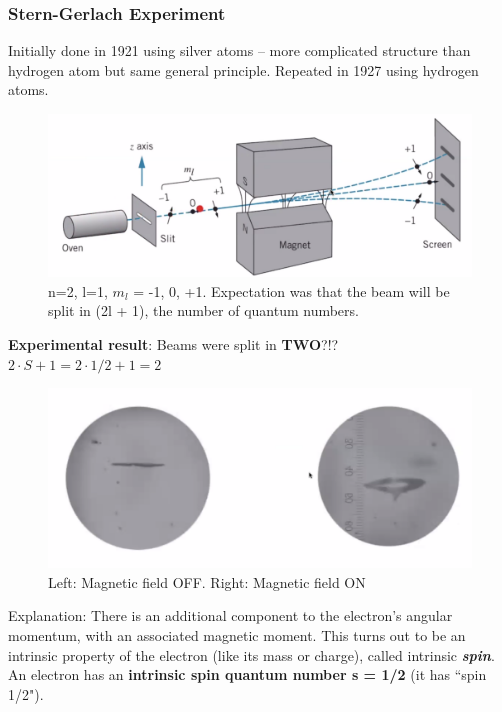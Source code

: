 \documentclass[class=article,crop=false]{standalone}
\begin{document}
\subsubsection{Stern-Gerlach Experiment}
Initially done in 1921 using silver atoms -- more complicated structure than hydrogen atom but same general principle. Repeated in 1927 using hydrogen atoms.

\begin{figure}[h!]
	\centering
	\includegraphics[width=1\linewidth]{./Images/gerlach.png}
	\caption{n=2, l=1, $m_l$ = -1, 0, +1. Expectation was that the beam will be split in (2l + 1), the number of quantum numbers.}
\end{figure}

\textbf{Experimental result}: Beams were split in \textbf{TWO}?!? \\
$ 2 \cdot S + 1 = 2 \cdot 1/2 + 1 = 2 $ \\

\begin{figure}[h!]
	\centering
	\includegraphics[width=.8\linewidth]{./Images/gerlach_results.png}
	\caption{Left: Magnetic field OFF. Right: Magnetic field ON}
\end{figure}

Explanation:
There is an additional component to the electron's angular momentum, with an associated magnetic moment. This turns out to be an intrinsic property of the electron (like its mass or charge), called intrinsic \textbf{\emph{spin}}.\\

An electron has an \textbf{intrinsic spin quantum number s = 1/2} (it has ``spin 1/2"). \\
\end{document}
